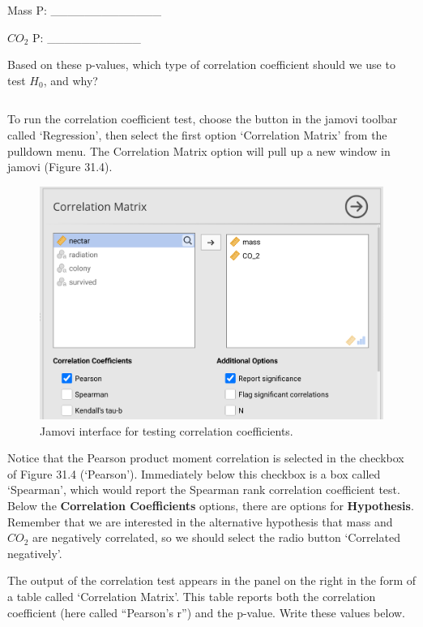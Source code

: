 \documentclass[
  openany]{scrbook}
\begin{document}
Mass P: \_\_\_\_\_\_\_\_\_\_\_\_\_

\(CO_{2}\) P: \_\_\_\_\_\_\_\_\_\_\_

Based on these p-values, which type of correlation coefficient should we use to test \(H_{0}\), and why?

\begin{verbatim}

\end{verbatim}

To run the correlation coefficient test, choose the button in the jamovi toolbar called `Regression', then select the first option `Correlation Matrix' from the pulldown menu.
The Correlation Matrix option will pull up a new window in jamovi (Figure 31.4).

\begin{figure}
\includegraphics[width=1\linewidth]{img/jamovi_correlation_interface} \caption{Jamovi interface for testing correlation coefficients.}\label{fig:unnamed-chunk-135}
\end{figure}

Notice that the Pearson product moment correlation is selected in the checkbox of Figure 31.4 (`Pearson').
Immediately below this checkbox is a box called `Spearman', which would report the Spearman rank correlation coefficient test.
Below the \textbf{Correlation Coefficients} options, there are options for \textbf{Hypothesis}.
Remember that we are interested in the alternative hypothesis that mass and \(CO_{2}\) are negatively correlated, so we should select the radio button `Correlated negatively'.

The output of the correlation test appears in the panel on the right in the form of a table called `Correlation Matrix'.
This table reports both the correlation coefficient (here called ``Pearson's r'') and the p-value.
Write these values below.
\end{document}
